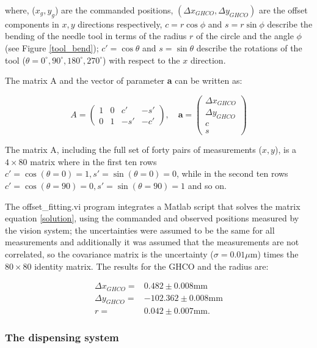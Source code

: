 \noindent where, ($x_g,y_g$) are the commanded positions, $(\Delta x_{GHCO},\Delta y_{GHCO})$ are the offset components in $x,y$ directions respectively, $c=r\cos\phi$ and  $s=r\sin\phi$ describe the bending of the needle tool in terms of the radius $r$ of the circle and the angle $\phi$ (see Figure \ref{tool_bend}); $c'=\cos\theta$ and  $s=\sin\theta$ describe the rotations of the tool ($\theta=0^\circ, 90^\circ, 180^\circ, 270^\circ$) with respect to the $x$ direction.

The matrix A and the vector of parameter \textbf{a} can be written as:

\begin{equation}
  A=
  \begin{pmatrix}
    1  & 0  & c' & -s' \\
    0  & 1  & -s' & -c' 
  \end{pmatrix}, \quad
  \textbf{a}=
  \begin{pmatrix}
    \Delta x_{GHCO}\\ 
    \Delta y_{GHCO}\\
    c \\
    s 
  \end{pmatrix}
\end{equation}

The matrix A, including the full set of forty pairs of measurements ($x,y$), is a $4\times80$ matrix where in the first ten rows $c'=\cos(\theta=0)=1, s'=\sin(\theta=0)=0$, while in the second ten rows $c'=\cos(\theta=90)=0, s'=\sin(\theta=90)=1$ and so on.   

The offset\_fitting.vi program integrates a Matlab script that solves the matrix equation \ref{solution}, using the commanded and observed positions measured by the vision system; the uncertainties were assumed to be the same for all measurements and additionally it was assumed that the measurements are not correlated, so the covariance matrix is the uncertainty ($\sigma=0.01 \mu$m) times the $80\times80$ identity matrix. The results for the GHCO and the radius are:

\begin{align}
  \Delta x_{GHCO}=& 0.482 \pm 0.008 \textrm{mm}\nonumber\\
  \Delta y_{GHCO}=& -102.362 \pm 0.008 \textrm{mm}\\
  r=&0.042 \pm 0.007 \textrm{mm}\nonumber.
\end{align}

\subsubsection*{The dispensing system}

